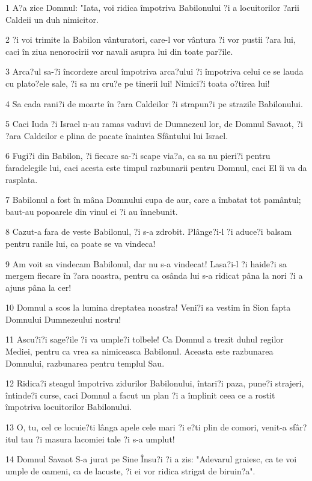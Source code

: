 \par 1 A?a zice Domnul: "Iata, voi ridica împotriva Babilonului ?i a locuitorilor ?arii Caldeii un duh nimicitor.
\par 2 ?i voi trimite la Babilon vânturatori, care-l vor vântura ?i vor pustii ?ara lui, caci în ziua nenorocirii vor navali asupra lui din toate par?ile.
\par 3 Arca?ul sa-?i încordeze arcul împotriva arca?ului ?i împotriva celui ce se lauda cu plato?ele sale, ?i sa nu cru?e pe tinerii lui! Nimici?i toata o?tirea lui!
\par 4 Sa cada rani?i de moarte în ?ara Caldeilor ?i strapun?i pe strazile Babilonului.
\par 5 Caci Iuda ?i Israel n-au ramas vaduvi de Dumnezeul lor, de Domnul Savaot, ?i ?ara Caldeilor e plina de pacate înaintea Sfântului lui Israel.
\par 6 Fugi?i din Babilon, ?i fiecare sa-?i scape via?a, ca sa nu pieri?i pentru faradelegile lui, caci acesta este timpul razbunarii pentru Domnul, caci El îi va da rasplata.
\par 7 Babilonul a fost în mâna Domnului cupa de aur, care a îmbatat tot pamântul; baut-au popoarele din vinul ei ?i au înnebunit.
\par 8 Cazut-a fara de veste Babilonul, ?i s-a zdrobit. Plânge?i-l ?i aduce?i balsam pentru ranile lui, ca poate se va vindeca!
\par 9 Am voit sa vindecam Babilonul, dar nu s-a vindecat! Lasa?i-l ?i haide?i sa mergem fiecare în ?ara noastra, pentru ca osânda lui s-a ridicat pâna la nori ?i a ajuns pâna la cer!
\par 10 Domnul a scos la lumina dreptatea noastra! Veni?i sa vestim în Sion fapta Domnului Dumnezeului nostru!
\par 11 Ascu?i?i sage?ile ?i va umple?i tolbele! Ca Domnul a trezit duhul regilor Mediei, pentru ca vrea sa nimiceasca Babilonul. Aceasta este razbunarea Domnului, razbunarea pentru templul Sau.
\par 12 Ridica?i steagul împotriva zidurilor Babilonului, întari?i paza, pune?i strajeri, întinde?i curse, caci Domnul a facut un plan ?i a împlinit ceea ce a rostit împotriva locuitorilor Babilonului.
\par 13 O, tu, cel ce locuie?ti lânga apele cele mari ?i e?ti plin de comori, venit-a sfâr?itul tau ?i masura lacomiei tale ?i s-a umplut!
\par 14 Domnul Savaot S-a jurat pe Sine Însu?i ?i a zis: "Adevarul graiesc, ca te voi umple de oameni, ca de lacuste, ?i ei vor ridica strigat de biruin?a".
